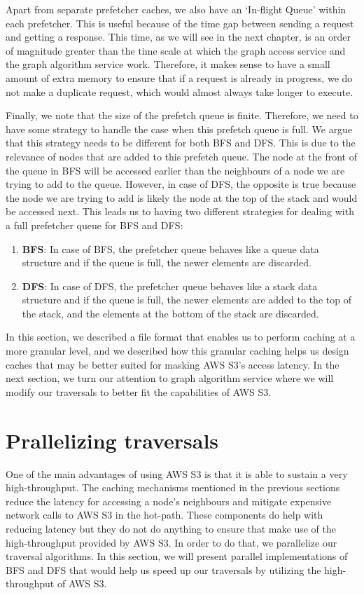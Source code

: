 \medskip
Apart from separate prefetcher caches, we also have an `In-flight Queue' within
each prefetcher. This is useful because of the time gap between sending a
request and getting a response. This time, as we will see in the next chapter,
is an order of magnitude greater than the time scale at which the graph access
service and the graph algorithm service work. Therefore, it makes sense to have
a small amount of extra memory to ensure that if a request is already in
progress, we do not make a duplicate request, which would almost always take
longer to execute. 

\medskip
Finally, we note that the size of the prefetch queue is finite. Therefore, we
need to have some strategy to handle the case when this prefetch queue is full.
We argue that this strategy needs to be different for both BFS and DFS. This is
due to the relevance of nodes that are added to this prefetch queue. The node at
the front of the queue in BFS will be accessed earlier than the neighbours of a
node we are trying to add to the queue. However, in case of DFS, the
opposite is true because the node we are trying to add is likely the node
at the top of the stack and would be accessed next. This leads us to having two
different strategies for dealing with a full prefetcher queue for BFS and DFS:
\begin{enumerate}
    \item \textbf{BFS}: In case of BFS, the prefetcher queue behaves like a
        queue data structure and if the queue is full, the newer elements are
        discarded.
    \item \textbf{DFS}: In case of DFS, the prefetcher queue behaves like a
        stack data structure and if the queue is full, the newer elements
        are added to the top of the stack, and the elements at the bottom of the
        stack are discarded.
\end{enumerate}

\bigskip
In this section, we described a file format that enables us to perform caching
at a more granular level, and we described how this granular caching helps us
design caches that may be better suited for masking AWS S3's access latency.
In the next section, we turn our
attention to graph algorithm service where we will modify our traversals to
better fit the capabilities of AWS S3.


\section{Prallelizing traversals}\label{sec:parallelAlgorithms}
One of the main advantages of using AWS S3 is that it is able to sustain a very
high-throughput. The caching mechanisms mentioned in the previous sections
reduce the latency for accessing a node's neighbours and mitigate expensive
network calls to AWS S3 in the hot-path. These components do help with reducing
latency but they do not do anything to ensure that make use of the
high-throughput provided by AWS S3. In order to do that, we parallelize our
traversal algorithms. In this section, we will present parallel implementations
of BFS and DFS that would help us speed up our traversals by utilizing the
high-throughput of AWS S3.

